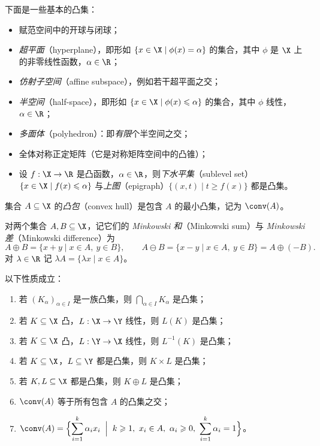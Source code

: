 \begin{example}
\label{exa:1}
下面是一些基本的凸集：
\begin{itemize}[itemsep=1pt]
  \item 赋范空间中的开球与闭球；
  \item \emph{超平面}（hyperplane），即形如 $\{x\in\X\mid\phi(x)=\alpha\}$ 的集合，其中 $\phi$ 是 $\X$ 上的非零线性函数，$\alpha\in\R$；
  \item \emph{仿射子空间}（affine subspace），例如若干超平面之交；
  \item \emph{半空间}（half-space），即形如 $\{x\in\X\mid\phi(x)\leqslant\alpha\}$ 的集合，其中 $\phi$ 线性，$\alpha\in\R$；
  \item \emph{多面体}（polyhedron）：即\emph{有限}个半空间之交；
  \item 全体对称正定矩阵（它是对称矩阵空间中的凸锥）；
  \item 设 $f:\X\to\R$ 是凸函数，$\alpha\in\R$，则\emph{下水平集}（sublevel set）$\{x\in\X\mid f(x)\leqslant\alpha\}$
        与\emph{上图}（epigraph）$\{(x,t)\mid t\geqslant f(x)\}$ 都是凸集。
\end{itemize}
\end{example}

\begin{definition}[凸包]
\label{def:3}
集合 $A\subseteq\X$ 的\emph{凸包}（convex hull）是包含 $A$ 的最小凸集，记为 $\conv(A)$。
\end{definition}

对两个集合 $A,B\subseteq\X$，记它们的 \emph{Minkowski 和}（Minkowski sum）与 \emph{Minkowski 差}（Minkowski difference）为
\[
  A\oplus B=\{x+y\mid x\in A,\ y\in B\},\qquad
  A\ominus B=\{x-y\mid x\in A,\ y\in B\}=A\oplus(-B).
\]
对 $\lambda\in\R$ 记 $\lambda A=\{\lambda x\mid x\in A\}$。

\begin{proposition}
\label{res:1}
以下性质成立：
\begin{enumerate}[label=(\roman*)]
  \item 若 $(K_\alpha)_{\alpha\in I}$ 是一族凸集，则 $\bigcap_{\alpha\in I}K_\alpha$ 是凸集；
  \item 若 $K\subseteq\X$ 凸，$L:\X\to\Y$ 线性，则 $L(K)$ 是凸集；
  \item 若 $K\subseteq\X$ 凸，$L:\Y\to\X$ 线性，则 $L^{-1}(K)$ 是凸集；
  \item 若 $K\subseteq\X$，$L\subseteq\Y$ 都是凸集，则 $K\times L$ 是凸集；
  \item 若 $K,L\subseteq\X$ 都是凸集，则 $K\oplus L$ 是凸集；
  \item $\conv(A)$ 等于所有包含 $A$ 的凸集之交；
  \item $\displaystyle\conv(A)=\Bigl\{\sum_{i=1}^k\alpha_ix_i \;\Bigm|\; k\geqslant1,\ x_i\in A,\ \alpha_i\geqslant0,\ \sum_{i=1}^k\alpha_i=1\Bigr\}$。
\end{enumerate}
\end{proposition}

